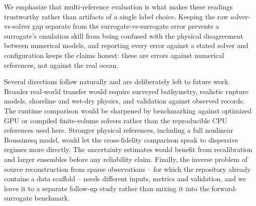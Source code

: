 We emphasize that multi-reference evaluation is what makes these readings trustworthy rather than artifacts of a single label choice. Keeping the raw solver-vs-solver gap separate from the surrogate-vs-surrogate error prevents a surrogate's emulation skill from being confused with the physical disagreement between numerical models, and reporting every error against a stated solver and configuration keeps the claims honest: these are errors against numerical references, not against the real ocean.

Several directions follow naturally and are deliberately left to future work. Broader real-world transfer would require surveyed bathymetry, realistic rupture models, shoreline and wet-dry physics, and validation against observed records. The runtime comparison would be sharpened by benchmarking against optimized GPU or compiled finite-volume solvers rather than the reproducible CPU references used here. Stronger physical references, including a full nonlinear Boussinesq model, would let the cross-fidelity comparison speak to dispersive regimes more directly. The uncertainty estimates would benefit from recalibration and larger ensembles before any reliability claim. Finally, the inverse problem of source reconstruction from sparse observations -- for which the repository already contains a data scaffold -- needs different inputs, metrics and validation, and we leave it to a separate follow-up study rather than mixing it into the forward-surrogate benchmark.

